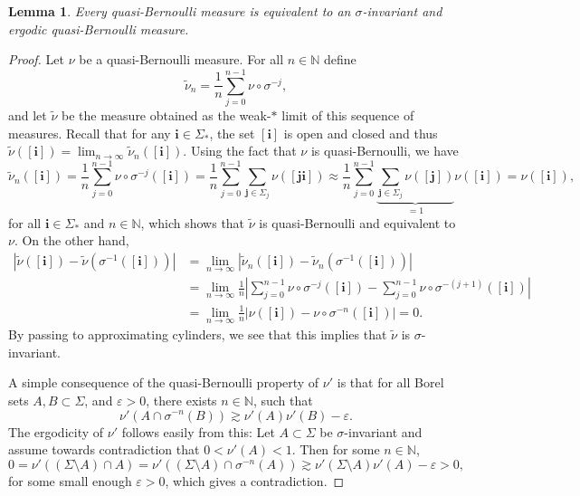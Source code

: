 \documentclass{PRM}
\newcommand{\field}[1]{\mathbb{#1}}
\newcommand{\N}{\field{N}}
\theoremstyle{plain}
\newtheorem{lemma}[thm]{Lemma}
\theoremstyle{definition}
\theoremstyle{remark}
\begin{document}
\begin{lemma}\label{lemma:quasi-bernoulli-equivalence}
Every quasi-Bernoulli measure is equivalent to an $\sigma$-invariant and ergodic quasi-Bernoulli measure.
\end{lemma}
\begin{proof}
Let $\nu$ be a quasi-Bernoulli measure. For all $n\in\N$ define
\begin{equation*}
    \tilde{\nu}_n=\frac{1}{n}\sum_{j=0}^{n-1}\nu\circ\sigma^{-j},
\end{equation*}
and let $\tilde{\nu}$ be the measure obtained as the weak-$*$ limit of this sequence of measures. Recall that for any $\mathbf{i}\in\Sigma_*$, the set $[\mathbf{i}]$ is open and closed and thus $\tilde{\nu}([\mathbf{i}])=\lim_{n\to\infty}\tilde{\nu}_n([\mathbf{i}])$. Using the fact that $\nu$ is quasi-Bernoulli, we have
\begin{equation*}
    \tilde{\nu}_n([\mathbf{i}])=\frac{1}{n}\sum_{j=0}^{n-1}\nu\circ\sigma^{-j}([\mathbf{i}])=\frac{1}{n}\sum_{j=0}^{n-1}\sum_{\mathbf{j}\in\Sigma_j}\nu([\mathbf{j}\mathbf{i}])\approx \frac{1}{n}\sum_{j=0}^{n-1}\underbrace{\sum_{\mathbf{j}\in\Sigma_j}\nu([\mathbf{j}])}_{=1}\nu([\mathbf{i}])=\nu([\mathbf{i}]),
\end{equation*}
for all $\mathbf{i}\in\Sigma_*$ and $n\in\N$, which shows that $\tilde{\nu}$ is quasi-Bernoulli and equivalent to $\nu$. On the other hand,
\begin{align*}
    |\tilde{\nu}([\mathbf{i}])-\tilde{\nu}(\sigma^{-1}([\mathbf{i}]))|&=\lim_{n\to\infty}|\tilde{\nu}_n([\mathbf{i}])-\tilde{\nu}_n(\sigma^{-1}([\mathbf{i}]))|\\
    &=\lim_{n\to\infty}\frac{1}{n}\left|\sum_{j=0}^{n-1}\nu\circ\sigma^{-j}([\mathbf{i}])-\sum_{j=0}^{n-1}\nu\circ\sigma^{-(j+1)}([\mathbf{i}])\right|\\
    &=\lim_{n\to\infty}\frac{1}{n}\left|\nu([\mathbf{i}])-\nu\circ\sigma^{-n}([\mathbf{i}])\right|=0.
\end{align*}
By passing to approximating cylinders, we see that this implies that $\tilde{\nu}$ is $\sigma$-invariant. 


A simple consequence of the quasi-Bernoulli property of $\nu'$ is that for all Borel sets $A,B\subset \Sigma$, and $\varepsilon>0$, there exists $n\in\N$, such that
\begin{equation*}
    \nu'(A\cap\sigma^{-n}(B))\gtrsim \nu'(A)\nu'(B)-\varepsilon.
\end{equation*}
The ergodicity of $\nu'$ follows easily from this: Let $A\subset \Sigma$ be $\sigma$-invariant and assume towards contradiction that $0<\nu'(A)<1$. Then for some $n\in\N$,
\begin{equation*}
    0=\nu'((\Sigma\setminus A) \cap A)=\nu'((\Sigma\setminus A) \cap \sigma^{-n}(A))\gtrsim\nu'(\Sigma\setminus A)\nu'(A)-\varepsilon>0,
\end{equation*}
for some small enough $\varepsilon>0$, which gives a contradiction.
\end{proof}
\end{document}
